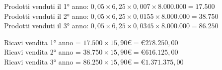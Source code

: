 \documentclass[12pt, a4paper]{article}
\begin{document}
\begin{center}
    Prodotti venduti il 1° anno: $0,05 \times 6,25 \times 0,007  \times 8.000.000 = 17.500$\\
    Prodotti venduti il 2° anno: $0,05 \times 6,25 \times 0,0155 \times 8.000.000 = 38.750$\\
    Prodotti venduti il 3° anno: $0,05 \times 6,25 \times 0,0345 \times 8.000.000 = 86.250$
\end{center}
\begin{center}
    Ricavi vendita 1° anno = $17.500 \times 15,90€ = €278.250,00$\\
    Ricavi vendita 2° anno = $38.750 \times 15,90€ = €616.125,00$\\
    Ricavi vendita 3° anno = $86.250 \times 15,90€ = €1.371.375,00$
\end{center}
\end{document}
